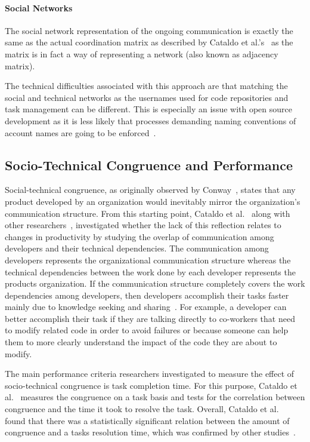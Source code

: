 \paragraph{Social Networks}
The social network representation of the ongoing communication is exactly the same as the actual coordination matrix as described by Cataldo et al.'s~\cite{cataldo:cscw:2006} as the matrix is in fact a way of representing a network (also known as adjacency matrix).

The technical difficulties associated with this approach are that matching the social and technical networks as the usernames used for code repositories and task management can be different. 
This is especially an issue with open source development as it is less likely that processes demanding naming conventions of account names are going to be enforced~\cite{schroeter:isese:2006}.

\subsection{Socio-Technical Congruence and Performance}
Social-technical congruence, as originally observed by Conway~\cite{conway:datamination:1968}, states that any product developed by an organization would inevitably mirror the organization's communication structure.
From this starting point, Cataldo et al.~\cite{cataldo:cscw:2006} along with other researchers~\cite{valetto:msr:2007,ducheneaut:cscw:2005,ehrlich:stc:2008}, investigated whether the lack of this reflection relates to changes in productivity by studying the overlap of communication among developers and their technical dependencies.
The communication among developers represents the organizational communication structure whereas the technical dependencies between the work done by each developer represents the products organization.
If the communication structure completely covers the work dependencies among developers, then developers accomplish their tasks faster mainly due to knowledge seeking and sharing~\cite{desouza2006:knowledge}.
For example, a developer can better accomplish their task if they are talking directly to co-workers that need to modify related code in order to avoid failures or because someone can help them to more clearly understand the impact of the code they are about to modify.

The main performance criteria researchers investigated to measure the effect of socio-technical congruence is task completion time.
For this purpose, Cataldo et al.~\cite{cataldo:cscw:2006} measures the congruence on a task basis and tests for the correlation between congruence and the time it took to resolve the task.
Overall, Cataldo et al.~\cite{cataldo:cscw:2006} found that there was a statistically significant relation between the amount of congruence and a tasks resolution time, which was confirmed by other studies~\cite{valetto:msr:2007,ehrlich:stc:2008}.


